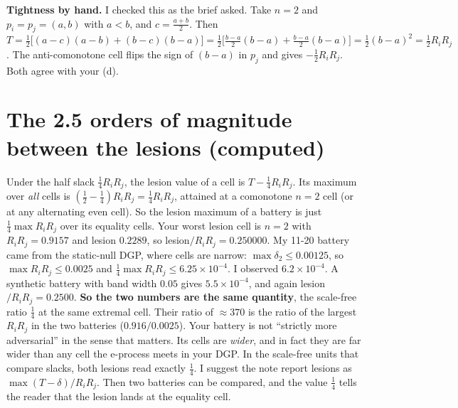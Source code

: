 \documentclass[11pt]{article}
\begin{document}
\textbf{Tightness by hand.} I checked this as the brief asked. Take $n=2$ and $p_i=p_j=(a,b)$ with $a<b$, and $c=\frac{a+b}2$. Then $T=\frac12\big[(a-c)(a-b)+(b-c)(b-a)\big]=\frac12\big[\frac{b-a}2(b-a)+\frac{b-a}2(b-a)\big]=\frac12(b-a)^2=\frac12R_iR_j$.
The anti-comonotone cell flips the sign of $(b-a)$ in $p_j$ and gives $-\frac12R_iR_j$. Both agree with your (d).

\section{The 2.5 orders of magnitude between the lesions (computed)}\label{sec:lesion}
Under the half slack $\frac14R_iR_j$, the lesion value of a cell is $T-\frac14R_iR_j$. Its maximum over \emph{all} cells is $(\frac12-\frac14)R_iR_j=\frac14R_iR_j$, attained at a comonotone $n=2$ cell (or at any alternating even cell).
So the lesion maximum of a battery is just $\frac14\max R_iR_j$ over its equality cells. Your worst lesion cell is $n=2$ with $R_iR_j=0.9157$ and lesion $0.2289$, so lesion$/R_iR_j=0.250000$.
My 11-20 battery came from the static-null DGP, where cells are narrow: $\max\delta_2\le0.00125$, so $\max R_iR_j\le0.0025$ and $\frac14\max R_iR_j\le6.25\times10^{-4}$. I observed $6.2\times10^{-4}$.
A synthetic battery with band width $0.05$ gives $5.5\times10^{-4}$, and again lesion$/R_iR_j=0.2500$.
\textbf{So the two numbers are the same quantity}, the scale-free ratio $\frac14$ at the same extremal cell. Their ratio of $\approx370$ is the ratio of the largest $R_iR_j$ in the two batteries ($0.916/0.0025$).
Your battery is not ``strictly more adversarial'' in the sense that matters. Its cells are \emph{wider}, and in fact they are far wider than any cell the e-process meets in your DGP. In the scale-free units that compare slacks, both lesions read exactly $\frac14$.
I suggest the note report lesions as $\max(T-\delta)/R_iR_j$. Then two batteries can be compared, and the value $\frac14$ tells the reader that the lesion lands at the equality cell.
\end{document}

